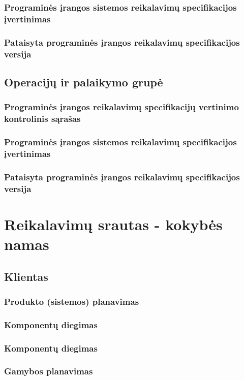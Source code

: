 \documentclass{VUMIFPSkursinis}
\begin{document}
			\subsubsection{Programinės įrangos sistemos reikalavimų specifikacijos įvertinimas}
			\subsubsection{Pataisyta programinės įrangos reikalavimų specifikacijos versija}
		\subsection{Operacijų ir palaikymo grupė}
			\subsubsection{Programinės įrangos reikalavimų specifikacijų vertinimo kontrolinis sąrašas}
			\subsubsection{Programinės įrangos sistemos reikalavimų specifikacijos įvertinimas}
			\subsubsection{Pataisyta programinės įrangos reikalavimų specifikacijos versija}

	\section{Reikalavimų srautas - kokybės namas}
		\subsection{Klientas}
			\subsubsection{Produkto (sistemos) planavimas}
			\subsubsection{Komponentų diegimas}
			\subsubsection{Komponentų diegimas}
			\subsubsection{Gamybos planavimas}
\end{document}
